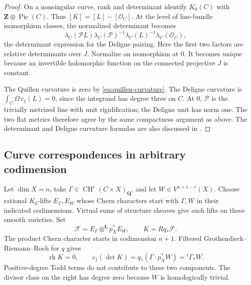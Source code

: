 \documentclass[11pt,a4paper]{article}
\newtheorem{corollary}[theorem]{Corollary}
\theoremstyle{definition}
\theoremstyle{remark}
\newcommand{\Q}{\mathbf Q}
\newcommand{\Z}{\mathbf Z}
\newcommand{\CH}{\operatorname{CH}}
\newcommand{\Pic}{\operatorname{Pic}}
\newcommand{\rk}{\operatorname{rk}}
\newcommand{\cP}{\mathcal P}
\newcommand{\cO}{\mathcal O}
\newcommand{\cD}{\mathcal D}
\newcommand{\MathEqref}[1]{\eqref{#1}}
\begin{document}
\begin{proof}
On a nonsingular curve, rank and determinant identify
\(K_0(C)\) with \(\Z\oplus\Pic(C)\). Thus
\([K]=[L]-[\cO_C]\). At the level of line-bundle isomorphism
classes, the normalized determinant becomes
\[
 \lambda_C(\cP L)\lambda_C(\cP)^{-1}
       \lambda_C(L)^{-1}\lambda_C(\cO_C),
\]
the determinant expression for the Deligne pairing. Here the first
two factors are relative determinants over \(J\). Normalize an
isomorphism at \(0\). It becomes unique because an invertible
holomorphic function on the connected projective \(J\) is
constant.

The Quillen curvature is zero by
\MathEqref{eq:quillen-curvature}. The Deligne curvature is
\(\int_C\Omega\,c_1(L)=0\), since the integrand has degree
three on \(C\). At \(0\), \(\cP\) is the trivially metrized
line with unit rigidification; the Deligne unit has norm one.
The two flat metrics therefore agree by the same compactness
argument as above. The determinant and Deligne curvature formulas
are also discussed in \cite[Section~2]{BiswasSchumacher}.
\end{proof}

\subsection{Curve correspondences in arbitrary codimension}
\label{sec:correspondence-metric}

Let \(\dim X=n\), take
\(\Gamma\in\CH^r(C\times X)_\Q\), and let
\(W\in V^{n+1-r}(X)\). Choose rational \(K_0\)-lifts
\(E_\Gamma,E_W\) whose Chern characters start with \(\Gamma,W\)
in their indicated codimensions. Virtual sums of structure sheaves
give such lifts on these smooth varieties. Set
\[
 \mathcal F=E_\Gamma\otimes^{\mathbf L}p_X^*E_W,
 \qquad K=Rq_*\mathcal F.
\]
The product Chern character starts in codimension \(n+1\).
Filtered Grothendieck--Riemann--Roch for \(q\) gives
\begin{equation}\label{eq:grr-leading}
 \rk K=0,\qquad
 c_1(\det K)=q_*(\Gamma\cdot p_X^*W)={}^t\Gamma_*W.
\end{equation}
Positive-degree Todd terms do not contribute to these two
components. The divisor class on the right has degree zero because
\(W\) is homologically trivial.

\end{document}
